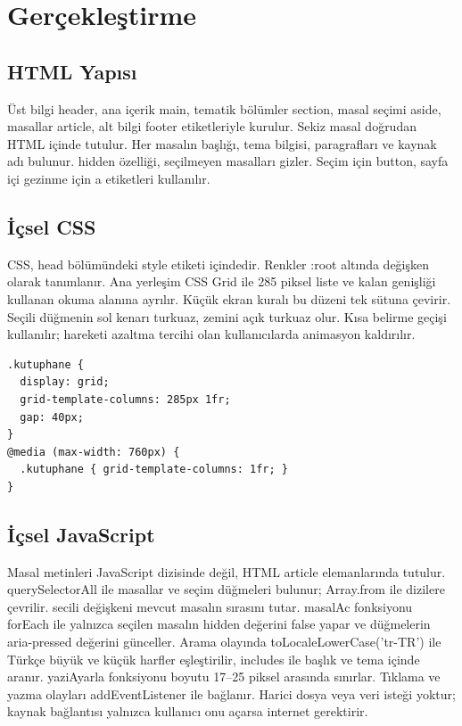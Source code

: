\documentclass[12pt,a4paper]{article}
\begin{document}
\section{Gerçekleştirme}


\subsection{HTML Yapısı}
Üst bilgi header, ana içerik main, tematik bölümler section, masal seçimi aside,
masallar article, alt bilgi footer etiketleriyle kurulur. Sekiz masal doğrudan
HTML içinde tutulur. Her masalın başlığı, tema bilgisi, paragrafları ve kaynak
adı bulunur. hidden özelliği, seçilmeyen masalları gizler. Seçim için button,
sayfa içi gezinme için a etiketleri kullanılır.

\subsection{İçsel CSS}
CSS, head bölümündeki style etiketi içindedir. Renkler :root altında değişken
olarak tanımlanır. Ana yerleşim CSS Grid ile 285 piksel liste ve kalan genişliği
kullanan okuma alanına ayrılır. Küçük ekran kuralı bu düzeni tek sütuna çevirir.
Seçili düğmenin sol kenarı turkuaz, zemini açık turkuaz olur. Kısa belirme geçişi kullanılır; hareketi
azaltma tercihi olan kullanıcılarda animasyon kaldırılır.

\begin{lstlisting}[caption={İçsel CSS'ten önemli bir bölüm}]
.kutuphane {
  display: grid;
  grid-template-columns: 285px 1fr;
  gap: 40px;
}
@media (max-width: 760px) {
  .kutuphane { grid-template-columns: 1fr; }
}
\end{lstlisting}

\subsection{İçsel JavaScript}
Masal metinleri JavaScript dizisinde değil, HTML article elemanlarında tutulur.
querySelectorAll ile masallar ve seçim düğmeleri bulunur; Array.from ile dizilere
çevrilir. secili değişkeni mevcut masalın sırasını tutar. masalAc fonksiyonu
forEach ile yalnızca seçilen masalın hidden değerini false yapar ve düğmelerin
aria-pressed değerini günceller. Arama olayında toLocaleLowerCase('tr-TR') ile
Türkçe büyük ve küçük harfler eşleştirilir, includes ile başlık ve tema içinde
aranır. yaziAyarla fonksiyonu boyutu 17--25 piksel arasında sınırlar. Tıklama
ve yazma olayları addEventListener ile bağlanır. Harici dosya veya veri isteği
yoktur; kaynak bağlantısı yalnızca kullanıcı onu açarsa internet gerektirir.
\end{document}
